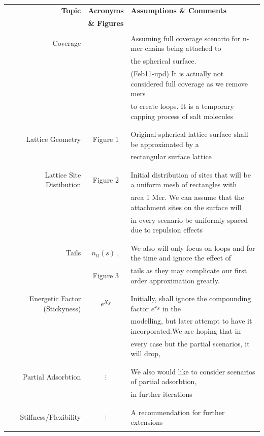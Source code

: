 \documentclass[10pt,letterpaper]{article}
\begin{document}
\begin{center}
\begin{tabular}{r|c|l}
	\textbf{Topic} & \textbf{Acronyms} & \textbf{Assumptions \& Comments} \\ 
	&\textbf{\& Figures}&\\
	\hline
	&&\\
	Coverage&  &Assuming full coverage scenario for n-mer chains being attached to\\ &&the spherical surface. \\ &&(Feb11-upd) It is actually not considered full coverage as we remove mers\\ &&to create loops. It is a temporary capping process of salt molecules\\
	&&\\
	\hline
	&&\\ 	
	Lattice Geometry& Figure 1 & Original spherical lattice surface shall be approximated by a\\ &&rectangular surface lattice\\
	&&\\
	\hline
	&&\\ 
	Lattice Site Distibution& Figure 2 & Initial distribution of sites that will be a uniform mesh of rectangles with\\ &&area 1 Mer. We can assume that the attachment sites on the surface will\\ &&in every scenario be uniformly spaced due to repulsion effects \\
	&&\\
	\hline
	&&\\ 
	Tails& $n_{tl}(s)~,$&We also will only focus on loops and for the time and ignore the effect of\\ &Figure 3&tails as they may complicate our first order approximation greatly.\\
	&&\\
	\hline
	&&\\ 
	Energetic Factor (Stickyness)& $e^{X_{S}}$&  Initially, shall ignore the compounding factor $e^{x_S}$ in the \\ &&modelling, but later attempt to have it incorporated.We are hoping that in\\ &&every case but the partial scenarios, it will drop,\\
	&&\\
	\hline
	&&\\ 
	Partial Adsorbtion& $\vdots$& We also would like to consider scenarios of partial adsorbtion,\\&&in further iterations\\
	&&\\
	\hline
	&&\\ 
	Stiffness/Flexibility& $\vdots$& A recommendation for further extensions\\
	&&\\ 
	\hline 
\end{tabular}
\end{center}
\end{document}
